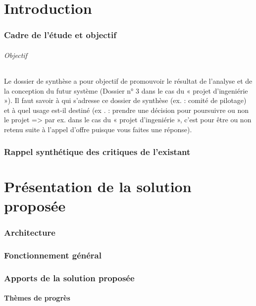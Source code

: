 \part{Introduction}

\section{Cadre de l’étude et objectif}

\paragraph{Objectif}
Le dossier de synthèse a pour objectif de promouvoir le résultat de l’analyse et de la
conception du futur système (Dossier n° 3 dans le cas du « projet d’ingeniérie »). Il faut savoir
à qui s’adresse ce dossier de synthèse (ex. : comité de pilotage) et à quel usage est-il destiné
(ex . : prendre une décision pour poursuivre ou non le projet => par ex. dans le cas du « projet
d’ingeniérie », c’est pour être ou non retenu suite à l’appel d’offre puisque vous faites une réponse).

\section{Rappel synthétique des critiques de l’existant}



\part{Présentation de la solution proposée}

\section{Architecture}

\section{Fonctionnement général}

\section{Apports de la solution proposée}

\subsection{Thèmes de progrès}

